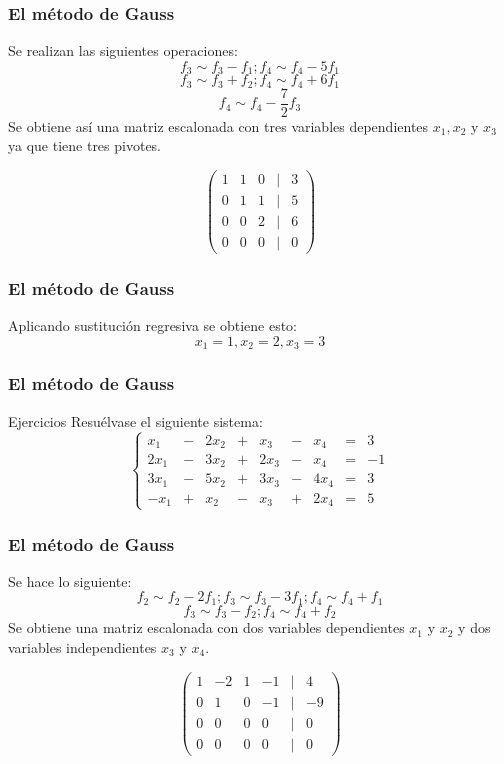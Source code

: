 \documentclass[12pt]{article}
\begin{document}
                 \begin{frame}
    \frametitle{El m\'etodo de Gauss}
Se realizan las siguientes operaciones:
\[f_3 \sim f_3-f_1; f_4 \sim f_4-5f_1\]
\[f_3 \sim f_3+f_2; f_4 \sim f_4+6f_1\]
\[f_4 \sim f_4-\frac{7}{2}f_3\]
Se obtiene as\'i una matriz escalonada con tres variables dependientes $x_1,x_2$ y $x_3$ ya que tiene tres pivotes.

\[
\left(\begin{array}{ccccc}1 & 1 & 0 & | & 3 \\ 0   & 1 & 1 & | & 5 \\
0 &0  & 2& | & 6 \\
0 &0 & 0  & | & 0\end{array}\right)
\]
  \end{frame} 

  
                   \begin{frame}
    \frametitle{El m\'etodo de Gauss}
Aplicando sustituci\'on regresiva se obtiene esto: 
\[x_1 = 1, x_2 = 2, x_3 = 3\]
  \end{frame} 
  
  
  
  
                 \begin{frame}
    \frametitle{El m\'etodo de Gauss}
       \begin{block}{Ejercicios}
Resu\'elvase el siguiente sistema:
\[
\left\{\begin{array}{ccccccccc}x_1 & - & 2x_2 & +  & x_3  & - &x_4& = & 3 \\
2x_1  & -  & 3x_2 & + & 2x_3 & -&x_4 & = & -1 \\
3x_1 &  - &  5x_2 & + & 3x_3 & - &4x_4& = & 3 \\
-x_1 & + & x_2 & - & x_3 & +&2x_4 & = & 5\end{array}\right.
\]

\end{block}
  \end{frame} 
  
  
  \begin{frame}
    \frametitle{El m\'etodo de Gauss}
Se hace lo siguiente:
\[f_2 \sim f_2-2f_1; f_3 \sim f_3-3f_1; f_4 \sim f_4+f_1\]
\[f_3 \sim f_3-f_2; f_4 \sim f_4+f_2\]
Se obtiene una matriz escalonada con dos variables dependientes $x_1$ y $x_2$ y dos variables independientes $x_3$ y $x_4$.

\[
\left(\begin{array}{cccccc}1 &-2 & 1 & -1&| & 4 \\ 0   & 1 & 0& -1 & | & -9 \\
0 &0 &0  & 0& | & 0 \\
0 &0 & 0&0  & | & 0\end{array}\right)
\]
  \end{frame} 
  
\end{document}
